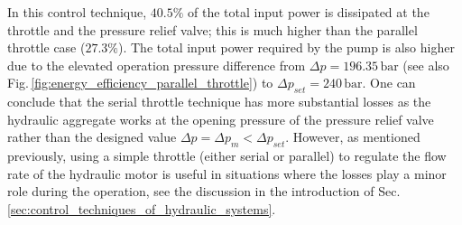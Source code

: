 In this control technique, $40.5\%$ of the total input power is dissipated at the throttle and the pressure relief valve; this is much higher than the parallel throttle case ($27.3\%$). The total input power required by the pump is also higher due to the elevated operation pressure difference from $\Delta p=196.35\,\mathrm{bar}$ (see also Fig.\,\ref{fig:energy_efficiency_parallel_throttle}) to $\Delta p_{set}=240\,\mathrm{bar}$. One can conclude that the serial throttle technique has more substantial losses as the hydraulic aggregate works at the opening pressure of the pressure relief valve rather than the designed value $\Delta p = \Delta p_m < \Delta p_{set}$. However, as mentioned previously, using a simple throttle (either serial or parallel) to regulate the flow rate of the hydraulic motor is useful in situations where the losses play a minor role during the operation, see the discussion in the introduction of Sec.\,\ref{sec:control_techniques_of_hydraulic_systems}.

%








\clearpage






